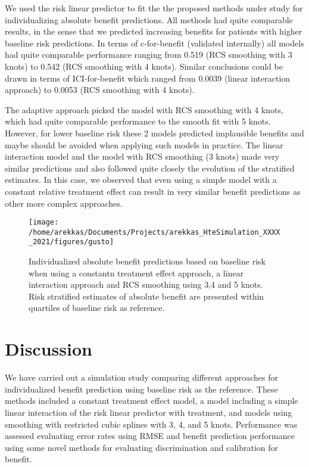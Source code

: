 \documentclass{article}
\begin{document}
We used the risk linear predictor to fit the the proposed methods under
study for individualizing absolute benefit predictions. All methods had
quite comparable results, in the sense that we predicted increasing
benefits for patients with higher baseline risk predictions. In terms of
c-for-benefit (validated internally) all models had quite comparable
performance ranging from 0.519 (RCS smoothing with 3 knots) to 0.542
(RCS smoothing with 4 knots). Similar conclusions could be drawn in
terms of ICI-for-benefit which ranged from 0.0039 (linear interaction
approach) to 0.0053 (RCS smoothing with 4 knots).

The adaptive approach picked the model with RCS smoothing with 4 knots,
which had quite comparable performance to the smooth fit with 5 knots.
However, for lower baseline risk these 2 models predicted implausible
benefits and maybe should be avoided when applying such models in
practice. The linear interaction model and the model with RCS smoothing
(3 knots) made very similar predictions and also followed quite closely
the evolution of the stratified estimates. In this case, we observed
that even using a simple model with a constant relative treatment effect
can result in very similar benefit predictions as other more complex
approaches.

\begin{figure}
\texttt{[image: /home/arekkas/Documents/Projects/arekkas\_HteSimulation\_XXXX\_2021/figures/gusto]} \caption{Individualized absolute benefit predictions based on baseline risk when using a constantn treatment effect approach, a linear interaction approach and RCS smoothing using 3,4 and 5 knots. Risk stratified estimates of absolute benefit are presented within quartiles of baseline risk as reference.}\label{fig:gusto}
\end{figure}

\hypertarget{discussion}{%
\section{Discussion}\label{discussion}}

We have carried out a simulation study comparing different approaches
for individualized benefit prediction using baseline risk as the
reference. These methods included a constant treatment effect model, a
model including a simple linear interaction of the risk linear predictor
with treatment, and models using smoothing with restricted cubic splines
with 3, 4, and 5 knots. Performance was assessed evaluating error rates
using RMSE and benefit prediction performance using some novel methods
for evaluating discrimination and calibration for benefit.
\end{document}
